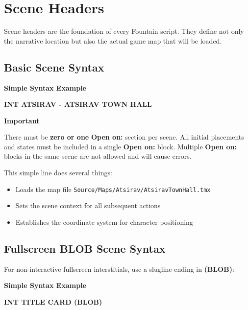 \documentclass[11pt,letterpaper,oldstylefigures]{memoir}
\newcommand{\slugline}[1]{\nobreak\textbf{\MakeUppercase{#1}}\par\nobreak\vspace{1\baselineskip}}
\newenvironment{FountainExample}
  {\begingroup
  \ttfamily\small
   \setlength{\parindent}{0pt}
  \setlength{\parskip}{0.5em}
  \allowdisplaybreaks
  \setlength{\displaywidowpenalty}{0}
  \setlength{\widowpenalty}{0}
  \setlength{\clubpenalty}{0}
  \setlength{\interlinepenalty}{0}
}
  {\endgroup}
\newenvironment{SimpleExample}
{\begingroup
\small
\setlength{\parindent}{0pt}
\setlength{\parskip}{0.5em}
\allowdisplaybreaks
\setlength{\displaywidowpenalty}{0}
\setlength{\widowpenalty}{0}
\setlength{\clubpenalty}{0}
\setlength{\interlinepenalty}{0}
\begin{tcolorbox}[
    colback=blue!5,
    colframe=blue!75!black,
    boxrule=0.5pt,
    arc=2pt,
    left=0.5em,
    right=0.5em,
    top=0.25em,
    bottom=0.25em
]
\textbf{Simple Syntax Example}
\end{tcolorbox}\par
}
{\endgroup}
\newenvironment{Important}
{\begingroup
\small
\setlength{\parindent}{0pt}
\setlength{\parskip}{0.5em}
\allowdisplaybreaks
\setlength{\displaywidowpenalty}{0}
\setlength{\widowpenalty}{0}
\setlength{\clubpenalty}{0}
\setlength{\interlinepenalty}{0}
\begin{tcolorbox}[
    colback=yellow!5,
    colframe=yellow!75!black,
    boxrule=0.5pt,
    arc=2pt,
    left=0.5em,
    right=0.5em,
    top=0.25em,
    bottom=0.25em
]
\textbf{Important}
\end{tcolorbox}\par
}
{\endgroup}
\newcommand{\paragraphbreak}{\vspace{0.5em}}
\newcommand{\fountain}[1]{\textbf{#1}}
\begin{document}
\section{Scene Headers}
\paragraphbreak

Scene headers are the foundation of every Fountain script. They define not only the narrative location but also the actual game map that will be loaded.

\subsection{Basic Scene Syntax}
\paragraphbreak

\begin{SimpleExample}
\begin{FountainExample}
\slugline{INT ATSIRAV - ATSIRAV TOWN HALL}
\end{FountainExample}
\end{SimpleExample}

\begin{Important}
There must be \textbf{zero or one} \fountain{Open on:} section per scene. All initial placements and states must be included in a single \fountain{Open on:} block. Multiple \fountain{Open on:} blocks in the same scene are not allowed and will cause errors.
\end{Important}

This simple line does several things:
\begin{itemize}
\item Loads the map file \texttt{Source/Maps/Atsirav/AtsiravTownHall.tmx}
\item Sets the scene context for all subsequent actions
\item Establishes the coordinate system for character positioning
\end{itemize}

\subsection{Fullscreen BLOB Scene Syntax}
\paragraphbreak

For non-interactive fullscreen interstitials, use a slugline ending in \fountain{(BLOB)}:

\begin{SimpleExample}
\begin{FountainExample}
\slugline{INT TITLE CARD (BLOB)}
\end{FountainExample}
\end{SimpleExample}
\end{document}
